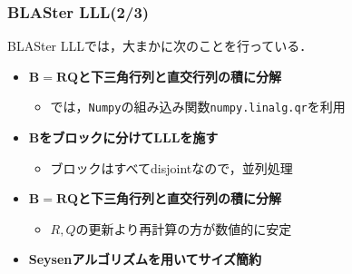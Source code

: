 \documentclass[12pt,aspectratio=169,table,dvipdfmx, leqno]{beamer}
\begin{document}
\begin{frame}
    \frametitle{BLASter LLL(2/3)}

    BLASter LLLでは，大まかに次のことを行っている．

    \begin{itemize}
        \item \textbf{$\bm{B}=\bm{RQ}$と下三角行列と直交行列の積に分解}
        \begin{itemize}
            \item \cite{DPS25}では，\texttt{Numpy}の組み込み関数\texttt{numpy.linalg.qr}を利用
        \end{itemize}
        \item \textbf{$\bm{B}$をブロックに分けてLLLを施す}
        \begin{itemize}
            \item ブロックはすべてdisjointなので，並列処理
        \end{itemize}
        \item \textbf{$\bm{B}=\bm{RQ}$と下三角行列と直交行列の積に分解}
        \begin{itemize}
            \item $R,Q$の更新より再計算の方が数値的に安定
        \end{itemize}
            \item \textbf{Seysenアルゴリズムを用いてサイズ簡約}
    \end{itemize}

\end{frame}
\end{document}
